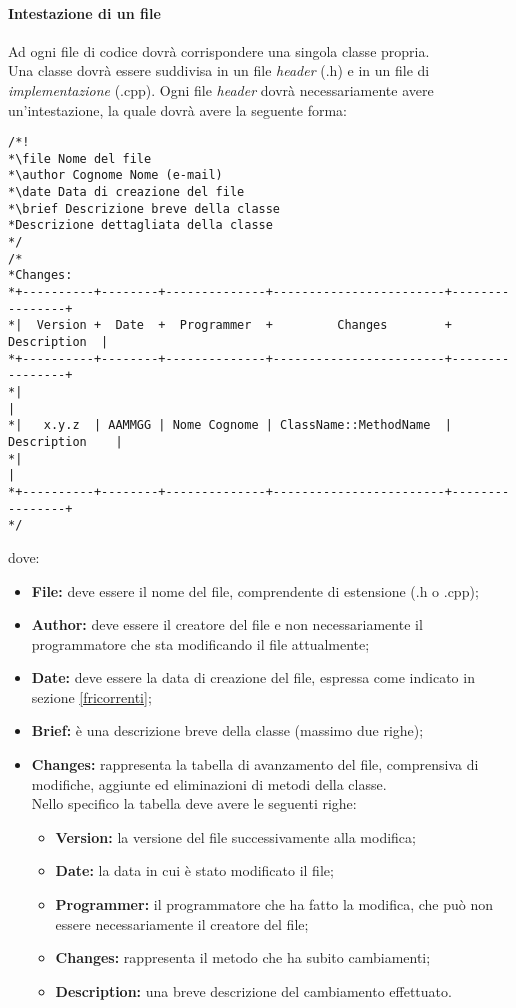 \paragraph{Intestazione di un file\\}
\label{intestazione}
Ad ogni file di codice dovrà corrispondere una singola classe propria.
\\Una classe dovrà essere suddivisa in un file \textit{header} (.h) e in un file di \textit{implementazione} (.cpp).
Ogni file \textit{header} dovrà necessariamente avere un'intestazione, la quale dovrà avere la seguente forma:
\begin{verbatim}
/*!
*\file Nome del file
*\author Cognome Nome (e-mail)
*\date Data di creazione del file
*\brief Descrizione breve della classe
*Descrizione dettagliata della classe
*/
/*
*Changes:
*+----------+--------+--------------+------------------------+----------------+
*|  Version +  Date  +  Programmer  +         Changes        +   Description  |
*+----------+--------+--------------+------------------------+----------------+
*|                                                                            |
*|   x.y.z  | AAMMGG | Nome Cognome | ClassName::MethodName  | Description    |
*|                                                                            |
*+----------+--------+--------------+------------------------+----------------+
*/
\end{verbatim}
dove:
\begin{itemize}
\item\textbf{File:} deve essere il nome del file, comprendente di estensione (.h o .cpp);
\item\textbf{Author:} deve essere il creatore del file e non necessariamente il programmatore che sta modificando il file attualmente;
\item\textbf{Date:} deve essere la data di creazione del file, espressa come indicato in sezione \ref{fricorrenti};
\item\textbf{Brief:} è una descrizione breve della classe (massimo due righe);
\item\textbf{Changes:} rappresenta la tabella di avanzamento del file, comprensiva di modifiche, aggiunte ed eliminazioni di metodi della classe.
\\Nello specifico la tabella deve avere le seguenti righe:
\begin{itemize}
\item\textbf{Version:} la versione del file successivamente alla modifica;
\item\textbf{Date:} la data in cui è stato modificato il file;
\item\textbf{Programmer:} il programmatore che ha fatto la modifica, che può non essere necessariamente il creatore del file;
\item\textbf{Changes:} rappresenta il metodo che ha subito cambiamenti;
\item\textbf{Description:} una breve descrizione del cambiamento effettuato.
\end{itemize}
\end{itemize}

